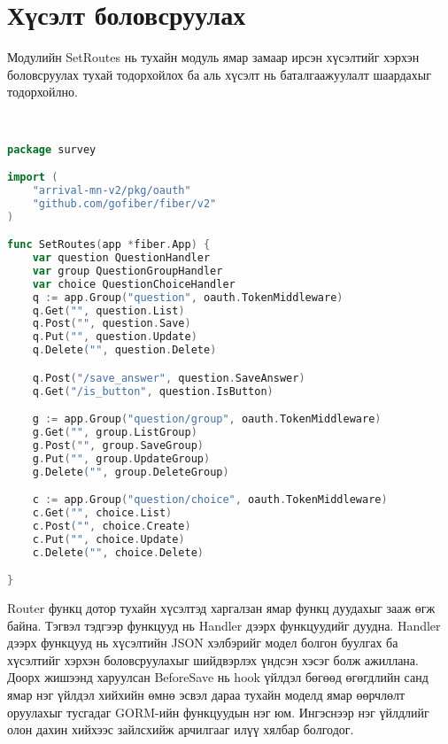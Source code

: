 \section{Хүсэлт боловсруулах} 

Модулийн SetRoutes нь тухайн модуль ямар замаар ирсэн хүсэлтийг хэрхэн боловсруулах тухай тодорхойлох ба аль хүсэлт нь баталгаажуулалт шаардахыг тодорхойлно. 

\\
\begin{lstlisting}[language=Go, caption=Модулийн Route хэсэг, frame=single]
package survey

import (
	"arrival-mn-v2/pkg/oauth"
	"github.com/gofiber/fiber/v2"
)

func SetRoutes(app *fiber.App) {
	var question QuestionHandler
	var group QuestionGroupHandler
	var choice QuestionChoiceHandler
	q := app.Group("question", oauth.TokenMiddleware)
	q.Get("", question.List)
	q.Post("", question.Save)
	q.Put("", question.Update)
	q.Delete("", question.Delete)

	q.Post("/save_answer", question.SaveAnswer)
	q.Get("/is_button", question.IsButton)

	g := app.Group("question/group", oauth.TokenMiddleware)
	g.Get("", group.ListGroup)
	g.Post("", group.SaveGroup)
	g.Put("", group.UpdateGroup)
	g.Delete("", group.DeleteGroup)

	c := app.Group("question/choice", oauth.TokenMiddleware)
	c.Get("", choice.List)
	c.Post("", choice.Create)
	c.Put("", choice.Update)
	c.Delete("", choice.Delete)

}

\end{lstlisting}

Router функц дотор тухайн хүсэлтэд харгалзан ямар функц дуудахыг зааж өгж байна. Тэгвэл тэдгээр функцууд нь Handler дээрх функцуудийг дуудна. Handler дээрх функцууд нь хүсэлтийн JSON хэлбэрийг модел болгон буулгах ба хүсэлтийг хэрхэн боловсруулахыг шийдвэрлэх үндсэн хэсэг болж ажиллана. Доорх жишээнд харуулсан BeforeSave нь hook үйлдэл бөгөөд өгөгдлийн санд ямар нэг үйлдэл хийхийн өмнө эсвэл дараа тухайн моделд ямар өөрчлөлт оруулахыг тусгадаг GORM-ийн функцуудын нэг юм. Ингэснээр нэг үйлдлийг олон дахин хийхээс зайлсхийж арчилгааг илүү хялбар болгодог. 

